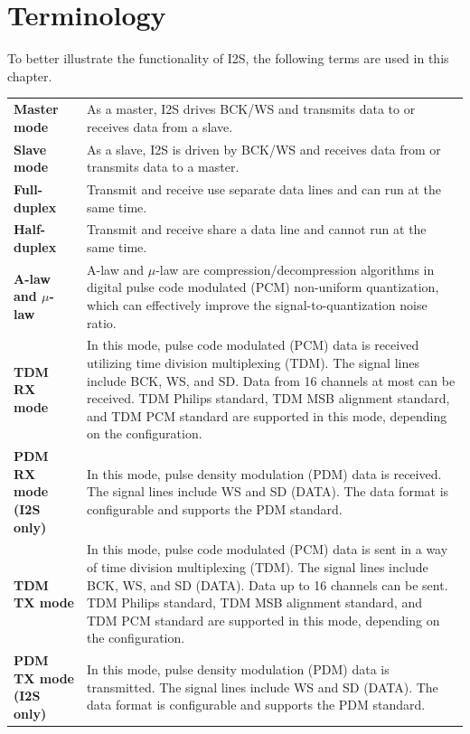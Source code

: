 \documentclass[main\_\_EN.tex]{subfiles}
\begin{document}
\section{Terminology}
\label{sec:i2s-term}

To better illustrate the functionality of I2S, the following terms are used in this chapter. 

\begin{longtable}[c]{ R{5cm} p{10cm} }
\textbf{Master mode}     & As a master, I2S drives BCK/WS and transmits data to or receives data from a slave. \\ 
\textbf{Slave mode}      & As a slave, I2S is driven by BCK/WS and receives data from or transmits data to a master. \\
\textbf{Full-duplex} & Transmit and receive use separate data lines and can run at the same time.\\
\textbf{Half-duplex} & Transmit and receive share a data line and cannot run at the same time.\\
\textbf{A-law and $\mu$-law} & A-law and $\mu$-law are compression/decompression algorithms in digital pulse code modulated (PCM) non-uniform quantization, which can effectively improve the signal-to-quantization noise ratio. \\
\textbf{TDM RX mode} & In this mode, pulse code modulated (PCM) data is received utilizing time division multiplexing (TDM). The signal lines include BCK, WS, and SD. Data from 16 channels at most can be received. TDM Philips standard, TDM MSB alignment standard, and TDM PCM standard are supported in this mode, depending on the configuration.\\
\textbf{PDM RX mode (I2S only)} & In this mode, pulse density modulation (PDM) data is received. The signal lines include WS and SD (DATA). The data format is configurable and supports the PDM standard.\\
\textbf{TDM TX mode} & In this mode, pulse code modulated (PCM) data is sent in a way of time division multiplexing (TDM). The signal lines include BCK, WS, and SD (DATA). Data up to 16 channels can be sent. TDM Philips standard, TDM MSB alignment standard, and TDM PCM standard are supported in this mode, depending on the configuration.\\
\textbf{PDM TX mode (I2S only)} & In this mode, pulse density modulation (PDM) data is transmitted. The signal lines include WS and SD (DATA). The data format is configurable and supports the PDM standard.\\

\end{longtable}
\end{document}
